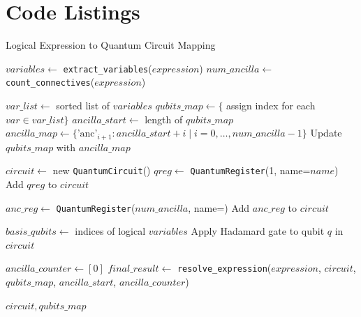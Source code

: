 \documentclass[encoding=utf8,british]{tumphthesis}
\begin{document}
\appendix
    \chapter{Code Listings}
    \label{Appendix_pseudocodes}
    
    \begin{algorithm}[H]
    \caption{Logical Expression to Quantum Circuit Mapping}
    \label{alg:LogicalToQuantum}
    \begin{algorithmic}[1]
        \State $variables \gets$ \texttt{extract\_variables}($expression$)
        \State $num\_ancilla \gets$ \texttt{count\_connectives}($expression$)
        
        \State $var\_list \gets$ sorted list of $variables$
        \State $qubits\_map \gets \{$ assign index for each $var \in var\_list \}$
        \State $ancilla\_start \gets$ length of $qubits\_map$
        \State $ancilla\_map \gets \{ \text{'anc'}_{i+1} : ancilla\_start + i \mid i = 0, \ldots, num\_ancilla-1 \}$
        \State Update $qubits\_map$ with $ancilla\_map$
        
        \State $circuit \gets$ new \texttt{QuantumCircuit}()
            \State $qreg \gets$ \texttt{QuantumRegister}(1, name=$name$)
            \State Add $qreg$ to $circuit$
        \EndFor
        
        \State $anc\_reg \gets$ \texttt{QuantumRegister}($num\_ancilla$, name=)
        \State Add $anc\_reg$ to $circuit$
        
        \State $basis\_qubits \gets$ indices of logical $variables$
            \State Apply Hadamard gate to qubit $q$ in $circuit$
        \EndFor
        
        \State $ancilla\_counter \gets [0]$ 
        \State $final\_result \gets$ \texttt{resolve\_expression}($expression$, $circuit$, $qubits\_map$, $ancilla\_start$, $ancilla\_counter$)
        
        \State \Return $circuit, qubits\_map$
    \EndFunction
    \end{algorithmic}
    \end{algorithm}
\end{document}
